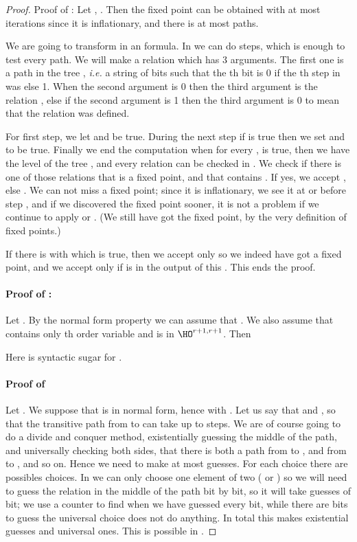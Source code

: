 \documentclass[a4paper,12pt]{article}
\theoremstyle{definition}
\newcommand{\hod}[2]{\ensuremath{\HO^{#1,#2}}}
\begin{document}
\begin{proof}Proof of : Let , .
  Then the fixed point can be obtained with at most 
  iterations since it is inflationary, and there is at most
   paths.

  We are going to transform  in an  formula.  In
   we can do  steps, which is enough to test
  every path. We will make a relation  which has 3 arguments. The
  first one is a path  in the tree , {\it i.e.} a
  string of bits such that the th bit is 0 if the th step in
   was  else 1. When the second argument is 0 then the
  third argument is the relation , else if the second argument
  is 1 then the third argument is 0 to mean that the relation 
  was defined.

  For first step, we let  and  be true. During the
  next step if  is true then we set  and
   to be  true. Finally we end the
  computation when for every ,  is true, then we have
  the  level of the tree , and every
  relation  can be checked in . We check if there is
  one of those relations that is a fixed point, and that contains . If yes, we accept , else . We can not miss a
  fixed point; since it is inflationary, we see it at or before step , and if we discovered the fixed point sooner, it is not a
  problem if we continue to apply  or . (We still have got
  the fixed point, by the very definition of fixed points.)

  If there is  with  which is true, then we
  accept only  so we indeed have got a fixed point, and we
  accept only if  is in the output of this . This ends
  the proof.


\paragraph{Proof of  :}
Let . By the normal form property we can
assume that
. We
also assume that  contains only th order variable and
 is in \hod {r+1}{r+1}. Then

Here   is syntactic sugar for .

\paragraph{Proof of }
Let . We suppose that  is in normal form,
hence  with
. Let us say that  and , so that the
transitive path from  to  can take up to 
steps. We are of course going to do a divide and conquer method,
existentially guessing the middle  of the path, and
universally checking both sides, that there is both a path from
 to , and from  to
, and so on.  Hence we need to make at most
 guesses. For each choice there are
 possibles choices. In \AIFP{} we can only choose one
element of two ( or ) so we will need to guess the
relation in the middle of the path bit by bit, so it will take
 guesses of bit; we use a counter to find when
we have guessed every bit, while there are bits to guess the universal
choice does not do anything. In total this makes
 existential guesses and  universal ones. This is possible in .


\end{proof}
\end{document}
